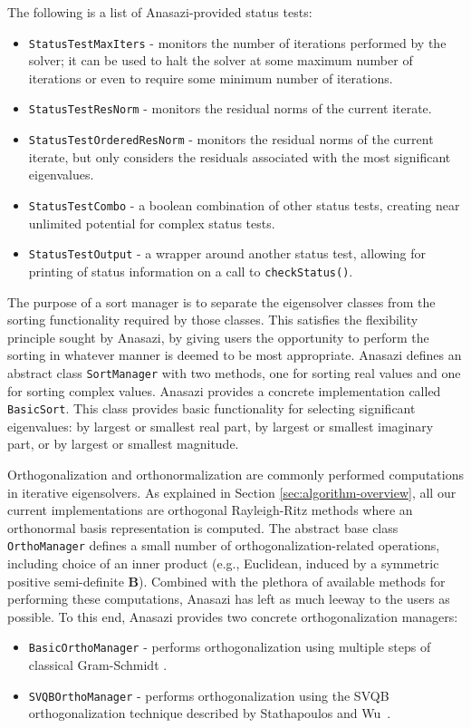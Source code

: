 \documentclass[acmtoms]{acmtrans2m}
\newcounter{algorithm}
\newcommand{\aspace}[1]{\texttt{#1}}
\begin{document}
The following is a list of Anasazi-provided status tests:
\begin{itemize}
  \item \aspace{StatusTestMaxIters} - monitors the number of iterations
    performed by the solver; it can be used to halt the solver at some maximum number of iterations
    or even to require some minimum number of iterations.
  \item \aspace{StatusTestResNorm} - monitors the residual norms of the
    current iterate.
  \item \aspace{StatusTestOrderedResNorm} - monitors the residual
    norms of the current iterate, but only considers the residuals associated with the
    most significant eigenvalues.
  \item \aspace{StatusTestCombo} - a boolean combination of
    other status tests, creating near unlimited potential for complex status tests.
  \item \aspace{StatusTestOutput} - a wrapper around another
    status test, allowing for printing of status information on a call to
    \verb!checkStatus()!.
\end{itemize}

The purpose of a sort manager is to separate the eigensolver classes from the sorting
functionality required by those classes. This satisfies the flexibility principle sought
by Anasazi, by giving users the opportunity to perform the sorting in whatever manner is
deemed to be most appropriate. Anasazi defines an abstract class \aspace{SortManager} with
two methods, one for sorting real values and one for sorting complex values.  Anasazi
provides a concrete implementation called \aspace{BasicSort}.  This class provides basic
functionality for selecting significant eigenvalues: by largest or smallest real part, by
largest or smallest imaginary part, or by largest or smallest magnitude.

Orthogonalization and orthonormalization are commonly performed
computations in iterative eigensolvers. As explained in Section
\ref{sec:algorithm-overview}, all our current implementations are
orthogonal Rayleigh-Ritz methods where an orthonormal basis
representation is computed. The abstract base class
\aspace{OrthoManager} defines a small number of
orthogonalization-related operations, including choice of an inner
product (e.g., Euclidean, induced by a symmetric positive semi-definite
$\mathbf{B}$). Combined with the plethora of available methods for
performing these computations, Anasazi has left as much leeway to
the users as possible. To this end, Anasazi provides two concrete
orthogonalization managers:
\begin{itemize}
\item
  \aspace{BasicOrthoManager} - performs orthogonalization using
  multiple steps of classical Gram-Schmidt \cite{dgks:76}.
\item
  \aspace{SVQBOrthoManager} - performs orthogonalization using the
  SVQB orthogonalization technique described by Stathapoulos and
  Wu~\cite{Stathopoulos:2002:BOP}.
\end{itemize}
\end{document}
